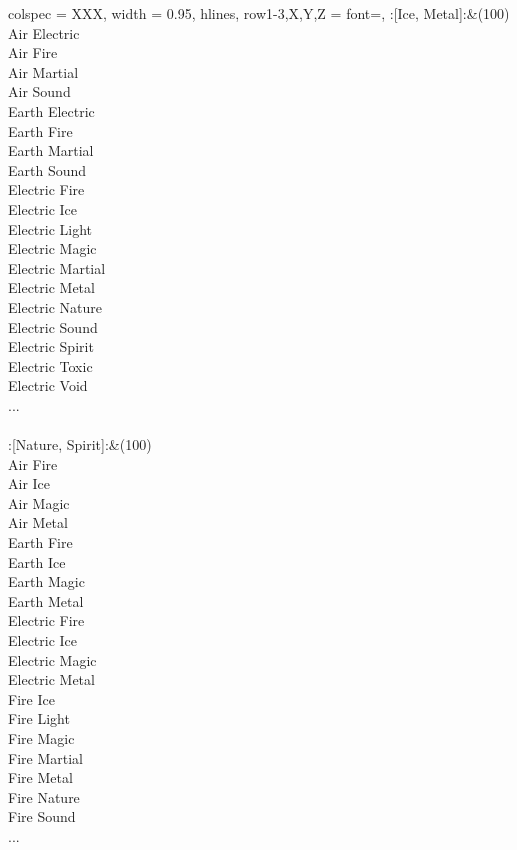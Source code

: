 \begin{longtblr}[
	caption = {2v2 Defending Weak},
	label = {2v2-Defending-Weak},
]{
	colspec = {XXX}, width = 0.95\linewidth,
	hlines,
	row{1-3,X,Y,Z} = {font=\bfseries},
}
	:[Ice, Metal]:&{(100)\\
	Air Electric \\
	Air Fire \\
	Air Martial \\
	Air Sound \\
	Earth Electric \\
	Earth Fire \\
	Earth Martial \\
	Earth Sound \\
	Electric Fire \\
	Electric Ice \\
	Electric Light \\
	Electric Magic \\
	Electric Martial \\
	Electric Metal \\
	Electric Nature \\
	Electric Sound \\
	Electric Spirit \\
	Electric Toxic \\
	Electric Void \\
	...\\
	}\\

	:[Nature, Spirit]:&{(100)\\
	Air Fire \\
	Air Ice \\
	Air Magic \\
	Air Metal \\
	Earth Fire \\
	Earth Ice \\
	Earth Magic \\
	Earth Metal \\
	Electric Fire \\
	Electric Ice \\
	Electric Magic \\
	Electric Metal \\
	Fire Ice \\
	Fire Light \\
	Fire Magic \\
	Fire Martial \\
	Fire Metal \\
	Fire Nature \\
	Fire Sound \\
	...\\
	}\\


\end{longtblr}
